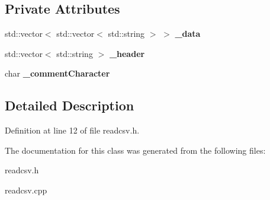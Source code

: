 \subsection*{Private Attributes}
\begin{DoxyCompactItemize}
\item 
\mbox{\label{classreadcsv_a17c06fc645f0057e92fa3c0d55a58756}} 
std\+::vector$<$ std\+::vector$<$ std\+::string $>$ $>$ {\bfseries \+\_\+data}
\item 
\mbox{\label{classreadcsv_ab1eb6eeb66768505281335774feca2c1}} 
std\+::vector$<$ std\+::string $>$ {\bfseries \+\_\+header}
\item 
\mbox{\label{classreadcsv_ac2d3cd159870efc5c92ef977d32399f9}} 
char {\bfseries \+\_\+comment\+Character}
\end{DoxyCompactItemize}


\subsection{Detailed Description}


Definition at line 12 of file readcsv.\+h.



The documentation for this class was generated from the following files\+:\begin{DoxyCompactItemize}
\item 
readcsv.\+h\item 
readcsv.\+cpp\end{DoxyCompactItemize}
